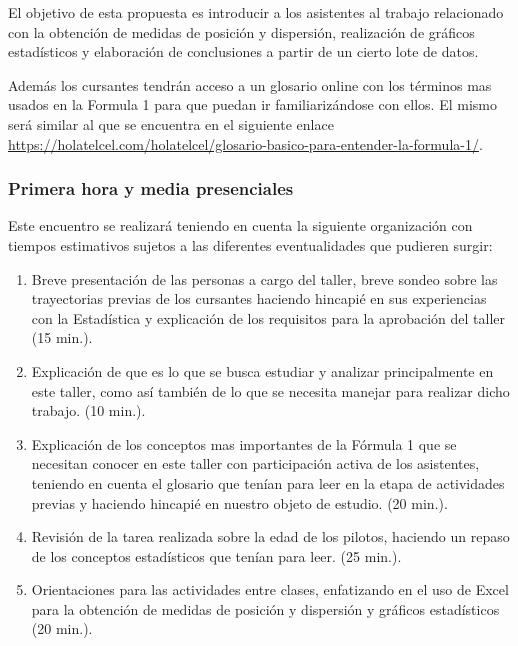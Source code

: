 El objetivo de esta propuesta es introducir a los asistentes al trabajo relacionado con la obtención de medidas de posición y dispersión, realización de gráficos estadísticos y elaboración de conclusiones a partir de un cierto lote de datos. 

Además los cursantes tendrán acceso a un glosario online con los términos mas usados en la Formula 1 para que puedan ir familiarizándose con ellos. El mismo será similar al que se encuentra en el siguiente enlace \url{https://holatelcel.com/holatelcel/glosario-basico-para-entender-la-formula-1/}.

\subsubsection{Primera hora y media presenciales}

Este encuentro se realizará teniendo en cuenta la siguiente organización con tiempos estimativos sujetos a las diferentes eventualidades que pudieren surgir:

\begin{enumerate}
	\item Breve presentación de las personas a cargo del taller, breve sondeo sobre las trayectorias previas de los cursantes haciendo hincapié en sus experiencias con la Estadística y explicación de los requisitos para la aprobación del taller (15 min.).
	
	\item Explicación de que es lo que se busca estudiar y analizar principalmente en este taller, como así también de lo que se necesita manejar para realizar dicho trabajo. (10 min.).
	
	\item Explicación de los conceptos mas importantes de la Fórmula 1 que se necesitan conocer en este taller con participación activa de los asistentes, teniendo en cuenta el glosario que tenían para leer en la etapa de actividades previas y haciendo hincapié en nuestro objeto de estudio. (20 min.).
	
	\item Revisión de la tarea realizada sobre la edad de los pilotos, haciendo un repaso de los conceptos estadísticos que tenían para leer. (25 min.).
	
	\item Orientaciones para las actividades entre clases, enfatizando en el uso de Excel para la obtención de medidas de posición y dispersión y gráficos estadísticos (20 min.).
\end{enumerate}

